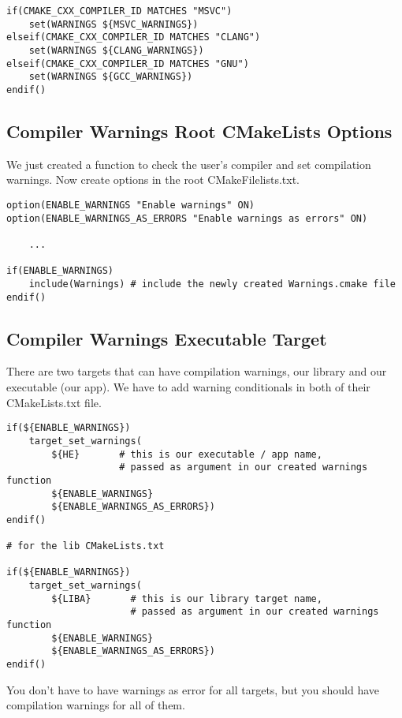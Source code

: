 \documentclass[openany]{report}
\begin{document}
\begin{verbatim}
if(CMAKE_CXX_COMPILER_ID MATCHES "MSVC")
    set(WARNINGS ${MSVC_WARNINGS})
elseif(CMAKE_CXX_COMPILER_ID MATCHES "CLANG")
    set(WARNINGS ${CLANG_WARNINGS})
elseif(CMAKE_CXX_COMPILER_ID MATCHES "GNU")
    set(WARNINGS ${GCC_WARNINGS})
endif()
\end{verbatim}


\subsection{Compiler Warnings Root CMakeLists Options}

We just created a function to check the user's compiler and set compilation warnings.
Now create options in the root CMakeFilelists.txt.

\begin{verbatim}
option(ENABLE_WARNINGS "Enable warnings" ON)
option(ENABLE_WARNINGS_AS_ERRORS "Enable warnings as errors" ON)

    ...

if(ENABLE_WARNINGS)
    include(Warnings) # include the newly created Warnings.cmake file
endif()
\end{verbatim}


\subsection{Compiler Warnings Executable Target}

There are two targets that can have compilation warnings, our library and our executable (our app). We have to 
add warning conditionals in both of their CMakeLists.txt file.

\begin{verbatim}
if(${ENABLE_WARNINGS})
    target_set_warnings(
        ${HE}       # this is our executable / app name,
                    # passed as argument in our created warnings function
        ${ENABLE_WARNINGS}
        ${ENABLE_WARNINGS_AS_ERRORS})
endif()

# for the lib CMakeLists.txt

if(${ENABLE_WARNINGS})
    target_set_warnings(
        ${LIBA}       # this is our library target name,
                      # passed as argument in our created warnings function
        ${ENABLE_WARNINGS}
        ${ENABLE_WARNINGS_AS_ERRORS})
endif()
\end{verbatim}

You don't have to have warnings as error for all targets, but you should have compilation warnings for all of them.
\end{document}

